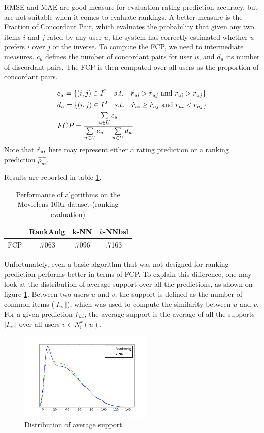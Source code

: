 RMSE and MAE are good measure for evaluation rating prediction accuracy, but
are not suitable when it comes to evaluate rankings. A better measure is the
Fraction of Concordant Pair, which evaluates the probability that given any two
items $i$ and $j$ rated by any user $u$, the system has correctly estimated
whether $u$ prefers $i$ over $j$ or the inverse. To compute the FCP, we need to
intermediate measures. $c_u$ defines the number of concordant pairs for user
$u$, and $d_u$ its number of discordant pairs. The FCP is then computed over all
users as the proportion of concordant pairs.

\begin{align*}
&c_u = \{(i, j) \in I^2 \quad s.t. \quad \hat{r}_{ui} > \hat{r}_{uj} \text{ and }
r_{ui} > r_{uj}\}\\
&d_u = \{(i, j) \in I^2 \quad s.t. \quad \hat{r}_{ui} \geq \hat{r}_{uj} \text{ and }
r_{ui} < r_{uj}\}\\
&FCP = \frac{\sum\limits_{u \in U} c_u}{\sum\limits_{u \in U} c_u + \sum\limits_{u \in U} d_u}
\end{align*}
Note that $\hat{r}_{ui}$ here may represent either a rating prediction or a
ranking prediction $\hat{\rho_{ui}}$.

Results are reported in table \ref{table:res100kRank}.

\begin{table}[!ht]
\centering
\caption{Performance of algorithms on the Movielens-100k dataset (ranking
evaluation)}
\label{table:res100kRank}
\begin{tabular}{| c || c | c | c |}
\toprule
     & RankAnlg &  k-NN & $k$-NNbsl\\
\midrule
FCP  &  .7063   & .7096 &  .7163   \\
\bottomrule
\end{tabular}
\end{table}

Unfortunately, even a basic algorithm that was not designed for ranking
prediction performs better in terms of FCP. To explain this difference, one may
look at the distribution of average support over all the predictions, as shown
on figure \ref{FIG_SUPPORT}. Between
two users $u$ and $v$, the support is defined as the number of common items
($|I_{uv}|$), which was used to compute the similarity between $u$ and $v$. For
a given prediction $\hat{r}_{ui}$, the average support is the average of all the
supports $|I_{uv}|$ over all users $v \in N_i^k(u)$.

\begin{figure}[!h]
\centering
\includegraphics[width=2.5in]{figures/support.pdf}
\caption{Distribution of average support.}
\label{FIG_SUPPORT}
\end{figure}

